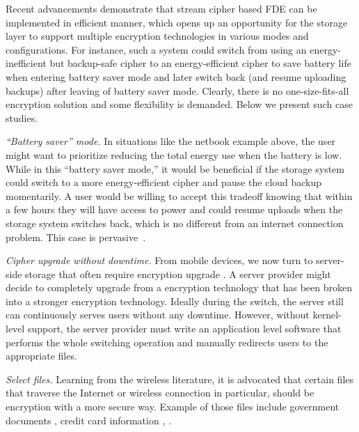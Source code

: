 Recent advancements demonstrate that stream cipher based FDE can be implemented
in efficient manner, which opens up an opportunity for the storage layer to
support multiple encryption technologies in various modes and configurations.
For instance, such a system could switch from using an energy-inefficient but
backup-safe cipher to an energy-efficient cipher to save battery life when
entering battery saver mode and later switch back (and resume uploading backups)
after leaving of battery saver mode. Clearly, there is no one-size-fits-all
encryption solution and some flexibility is demanded. Below we present \numCases
such case studies.

{\em ``Battery saver'' mode.} In situations like the netbook example above, the
user might want to prioritize reducing the total energy use when the battery is
low. While in this ``battery saver mode,'' it would be beneficial if the storage
system could switch to a more energy-efficient cipher and pause the cloud backup
momentarily. A user would be willing to accept this tradeoff knowing that within
a few hours they will have access to power and could resume uploads when the
storage system switches back, which is no different from an internet connection
problem. This case is pervasive~\cite{battery-saver1, battery-saver2,
battery-saver3, battery-saver4, battery-saver5}.

{\em Cipher upgrade without downtime.} From mobile devices, we now turn to
server-side storage that often require encryption upgrade \cite{some-citations}.
A server provider might decide to completely upgrade from a encryption
technology that has been broken into a stronger encryption technology. Ideally
during the switch, the server still can continuously serves users without any
downtime. However, without kernel-level support, the server provider must write
an application level software that performs the whole switching operation and
manually redirects users to the appropriate files.

{\em Select files.} Learning from the wireless literature, it is advocated that
certain files that traverse the Internet or wireless connection in particular,
should be encryption with a more secure way. Example of those files include
government documents \cite{citation-to-this-example}, credit card information
\cite{a}, \xxx \cite{a, b, c}.
